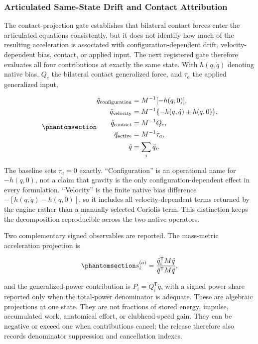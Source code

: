 \documentclass[
  letterpaper,
]{report}
\begin{document}
\subsubsection{Articulated Same-State Drift and Contact
Attribution}\label{articulated-same-state-drift-and-contact-attribution}

The contact-projection gate establishes that bilateral contact forces
enter the articulated equations consistently, but it does not identify
how much of the resulting acceleration is associated with
configuration-dependent drift, velocity-dependent bias, contact, or
applied input. The next registered gate therefore evaluates all four
contributions at exactly the same state. With \(h(q,\dot q)\) denoting
native bias, \(Q_c\) the bilateral contact generalized force, and
\(\tau_a\) the applied generalized input,

\begin{equation}\phantomsection\label{eq-articulated-drift-attribution}{
\begin{aligned}
\ddot q_{\mathrm{configuration}} &= M^{-1}[-h(q,0)],\\
\ddot q_{\mathrm{velocity}} &= M^{-1}\{-h(q,\dot q)+h(q,0)\},\\
\ddot q_{\mathrm{contact}} &= M^{-1}Q_c,\\
\ddot q_{\mathrm{active}} &= M^{-1}\tau_a,\\
\ddot q &= \sum_i \ddot q_i .
\end{aligned}
}\end{equation}

The baseline sets \(\tau_a=0\) exactly. ``Configuration'' is an
operational name for \(-h(q,0)\), not a claim that gravity is the only
configuration-dependent effect in every formulation. ``Velocity'' is the
finite native bias difference \(-[h(q,\dot q)-h(q,0)]\), so it includes
all velocity-dependent terms returned by the engine rather than a
manually selected Coriolis term. This distinction keeps the
decomposition reproducible across the two native operators.

Two complementary signed observables are reported. The mass-metric
acceleration projection is

\begin{equation}\phantomsection\label{eq-articulated-acceleration-share}{
s_i^{(a)}=
\frac{\ddot q_i^\mathsf{T}M\ddot q}
     {\ddot q^\mathsf{T}M\ddot q},
}\end{equation}

and the generalized-power contribution is \(P_i=Q_i^\mathsf{T}\dot q\),
with a signed power share reported only when the total-power denominator
is adequate. These are algebraic projections at one state. They are not
fractions of stored energy, impulse, accumulated work, anatomical
effort, or clubhead-speed gain. They can be negative or exceed one when
contributions cancel; the release therefore also records denominator
suppression and cancellation indexes.
\end{document}
